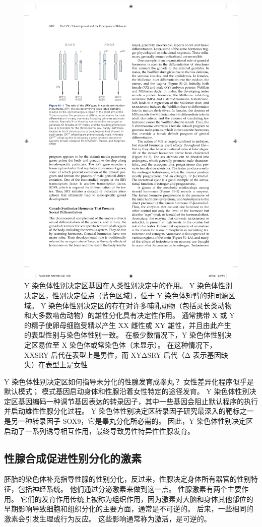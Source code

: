 \begin{figure}[htbp]
	\centering
	\includegraphics[width=0.5\linewidth]{chap51/fig_51_1}
	\caption{Y 染色体性别决定区基因在人类性别决定中的作用。
		Y 染色体性别决定区，性别决定位点（蓝色区域），位于 Y 染色体短臂的非同源区域。
		Y 染色体性别决定区的存在对许多哺乳动物（包括灵长类动物和大多数啮齿动物）的雄性分化具有决定性作用。
		通常携带 X 或 Y 的精子使卵母细胞受精以产生 XX 雌性或 XY 雄性，并且由此产生的表型性别与染色体性别一致。
		在极少数情况下，Y 染色体性别决定区易位至 X 染色体或常染色体（未显示）。
		在这种情况下，XXSRY 后代在表型上是男性，而 XYΔSRY 后代（Δ 表示基因缺失）在表型上是女性\cite{wilhelm2007sex} }
	\label{fig:51_1}
\end{figure}


Y 染色体性别决定区如何指导未分化的性腺发育成睾丸？
女性差异化程序似乎是默认模式；
模式基因启动身体和性腺沿着女性特定的途径发育。
Y 染色体性别决定区基因编码一种调节基因表达的转录因子，其中一些基因会阻止默认程序的执行并启动雄性性腺分化过程。
Y 染色体性别决定区转录因子研究最深入的靶标之一是另一种转录因子 SOX9，它是睾丸分化所必需的。
因此，Y 染色体性别决定区启动了一系列诱导相互作用，最终导致男性特异性性腺发育。



\subsection{性腺合成促进性别分化的激素}

胚胎的染色体补充指导性腺的性别分化，反过来，性腺决定身体所有器官的性别特征，包括神经系统。
他们通过分泌激素来做到这一点。
性腺激素有两个主要作用。
它们的发育作用传统上被称为组织作用，因为激素对大脑和身体其他部位的早期影响导致细胞和组织分化的主要方面，通常是不可逆的。
后来，一些相同的激素会引发生理或行为反应。
这些影响通常称为激活，是可逆的。


